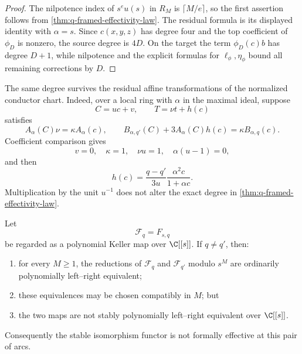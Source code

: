 \begin{proof}
The nilpotence index of \(s^eu(s)\) in \(R_M\) is
\(\lceil M/e\rceil\), so the first assertion follows from
\cref{thm:q-framed-effectivity-law}.  The residual formula is its displayed
identity with \(\alpha=s\).  Since \(c(x,y,z)\) has degree four and the top
coefficient of \(\phi_D\) is nonzero, the source degree is \(4D\).  On the
target the term \(\phi_D(c)b\) has degree \(D+1\), while nilpotence and the
explicit formulas for \(\ell_\phi,\eta_\phi\) bound all remaining
corrections by \(D\).
\end{proof}

The same degree survives the residual affine transformations of the
normalized conductor chart.  Indeed, over a local ring with \(\alpha\) in
the maximal ideal, suppose
\[
 C=uc+v,\qquad T=\nu t+h(c)
\]
satisfies
\[
 A_\alpha(C)\nu=\kappa A_\alpha(c),
\qquad
 B_{\alpha,q'}(C)+3A_\alpha(C)h(c)=
 \kappa B_{\alpha,q}(c).
\]
Coefficient comparison gives
\[
 v=0,\quad \kappa=1,\quad \nu u=1,\quad
 \alpha(u-1)=0,
\]
and then
\[
 h(c)=\frac{q-q'}{3u}\frac{\alpha^2c}{1+\alpha c}.
\]
Multiplication by the unit \(u^{-1}\) does not alter the exact degree in
\cref{thm:q-framed-effectivity-law}.

\begin{theorem}
\label{thm:q-stable-formal-noneffectivity}
Let
\[
 \mathcal F_q=F_{s,q}
\]
be regarded as a polynomial Keller map over \(\C[[s]]\).  If \(q\ne q'\),
then:
\begin{enumerate}[label=(\roman*)]
\item for every \(M\ge1\), the reductions of
\(\mathcal F_q\) and \(\mathcal F_{q'}\) modulo \(s^M\) are ordinarily
polynomially left--right equivalent;
\item these equivalences may be chosen compatibly in \(M\); but
\item the two maps are not stably polynomially left--right equivalent over
\(\C[[s]]\).
\end{enumerate}
Consequently the stable isomorphism functor is not formally effective at
this pair of arcs.
\end{theorem}

